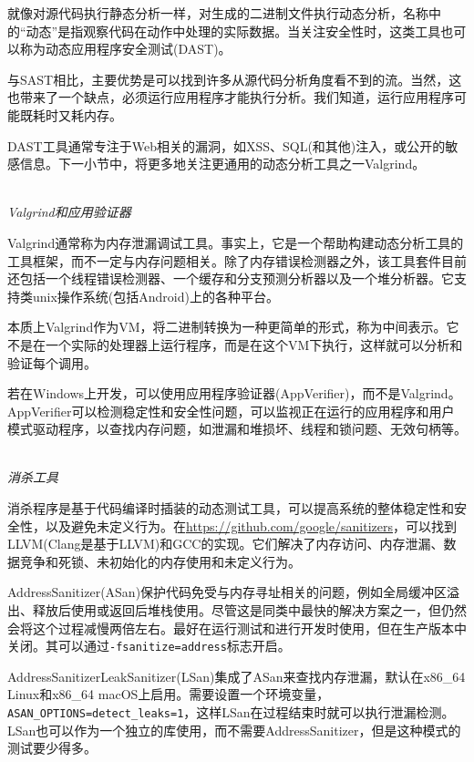 就像对源代码执行静态分析一样，对生成的二进制文件执行动态分析，名称中的“动态”是指观察代码在动作中处理的实际数据。当关注安全性时，这类工具也可以称为动态应用程序安全测试(DAST)。

与SAST相比，主要优势是可以找到许多从源代码分析角度看不到的流。当然，这也带来了一个缺点，必须运行应用程序才能执行分析。我们知道，运行应用程序可能既耗时又耗内存。

DAST工具通常专注于Web相关的漏洞，如XSS、SQL(和其他)注入，或公开的敏感信息。下一小节中，将更多地关注更通用的动态分析工具之一Valgrind。

\hspace*{\fill} \\ %
\noindent
\textit{Valgrind和应用验证器}

Valgrind通常称为内存泄漏调试工具。事实上，它是一个帮助构建动态分析工具的工具框架，而不一定与内存问题相关。除了内存错误检测器之外，该工具套件目前还包括一个线程错误检测器、一个缓存和分支预测分析器以及一个堆分析器。它支持类unix操作系统(包括Android)上的各种平台。

本质上Valgrind作为VM，将二进制转换为一种更简单的形式，称为中间表示。它不是在一个实际的处理器上运行程序，而是在这个VM下执行，这样就可以分析和验证每个调用。

若在Windows上开发，可以使用应用程序验证器(AppVerifier)，而不是Valgrind。AppVerifier可以检测稳定性和安全性问题，可以监视正在运行的应用程序和用户模式驱动程序，以查找内存问题，如泄漏和堆损坏、线程和锁问题、无效句柄等。

\hspace*{\fill} \\ %
\noindent
\textit{消杀工具}

消杀程序是基于代码编译时插装的动态测试工具，可以提高系统的整体稳定性和安全性，以及避免未定义行为。在\url{https://github.com/google/sanitizers}，可以找到LLVM(Clang是基于LLVM)和GCC的实现。它们解决了内存访问、内存泄漏、数据竞争和死锁、未初始化的内存使用和未定义行为。

AddressSanitizer(ASan)保护代码免受与内存寻址相关的问题，例如全局缓冲区溢出、释放后使用或返回后堆栈使用。尽管这是同类中最快的解决方案之一，但仍然会将这个过程减慢两倍左右。最好在运行测试和进行开发时使用，但在生产版本中关闭。其可以通过\texttt{-fsanitize=address}标志开启。

AddressSanitizerLeakSanitizer(LSan)集成了ASan来查找内存泄漏，默认在x86\_64 Linux和x86\_64 macOS上启用。需要设置一个环境变量，\texttt{ASAN\_OPTIONS=detect\_leaks=1}，这样LSan在过程结束时就可以执行泄漏检测。LSan也可以作为一个独立的库使用，而不需要AddressSanitizer，但是这种模式的测试要少得多。

